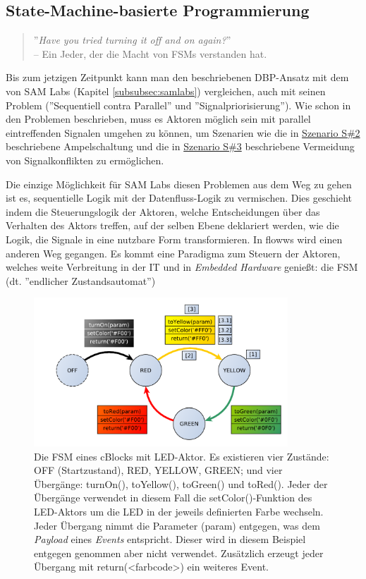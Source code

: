 \subsection{State-Machine-basierte Programmierung}\label{subsec:fsmprogrammierung}
\begin{quote}
    ''\textit{Have you tried turning it off and on again?}''  \\ -- Ein Jeder, der die Macht von \acp{FSM} verstanden hat.
\end{quote}

Bis zum jetzigen Zeitpunkt kann man den beschriebenen \ac{DBP}-Ansatz mit dem von SAM Labs (Kapitel \ref{subsubsec:samlabs}) vergleichen, auch mit seinen Problem (''Sequentiell contra Parallel'' und ''Signalpriorisierung''). Wie schon in den Problemen beschrieben, muss es Aktoren möglich sein mit parallel eintreffenden Signalen umgehen zu können, um Szenarien wie die in \hyperref[szenario2]{Szenario S\#2}  beschriebene Ampelschaltung und die in \hyperref[szenario3]{Szenario S\#3} beschriebene Vermeidung von Signalkonflikten zu ermöglichen.

Die einzige Möglichkeit für SAM Labs diesen Problemen aus dem Weg zu gehen ist es, sequentielle Logik mit der Datenfluss-Logik zu vermischen. Dies geschieht indem die Steuerungslogik der Aktoren, welche Entscheidungen über das Verhalten des Aktors treffen, auf der selben Ebene deklariert werden, wie die Logik, die Signale in eine nutzbare Form transformieren. In flowws wird einen anderen Weg gegangen. Es kommt eine Paradigma zum Steuern der Aktoren, welches weite Verbreitung in der IT und in \textit{Embedded Hardware} genießt: die \acl{FSM} (dt. ''endlicher Zustandsautomat'')

\begin{figure}[h]
  \centering
  \includegraphics[width=0.85\textwidth]{bilder/chapter4/chapter4_2/beispielstatemachine.pdf}
  \caption{Die \ac{FSM} eines cBlocks mit LED-Aktor. Es existieren vier Zustände: OFF (Startzustand), RED, YELLOW, GREEN; und vier Übergänge: turnOn(), toYellow(), toGreen() und toRed(). Jeder der Übergänge verwendet in diesem Fall die setColor()-Funktion des LED-Aktors um die LED in der jeweils definierten Farbe wechseln. Jeder Übergang nimmt die Parameter (param) entgegen, was dem \textit{Payload} eines \textit{Events} entspricht. Dieser wird in diesem Beispiel entgegen genommen aber nicht verwendet. Zusätzlich erzeugt jeder Übergang mit return(<farbcode>) ein weiteres Event.}
  \label{fig:beispielfsm}
\end{figure}

